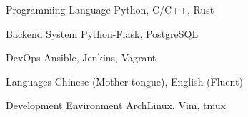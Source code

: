 

\begin{cvskills}

  \cvskill
    {Programming Language} %
    {Python, C/C++, Rust} %

  \cvskill
    {Backend System} %
    {Python-Flask, PostgreSQL} %

  \cvskill
    {DevOps} %
    {Ansible, Jenkins, Vagrant} %

  \cvskill
    {Languages} %
    {Chinese (Mother tongue), English (Fluent)} %

  \cvskill
    {Development Environment} %
    {ArchLinux, Vim, tmux} %

\end{cvskills}
